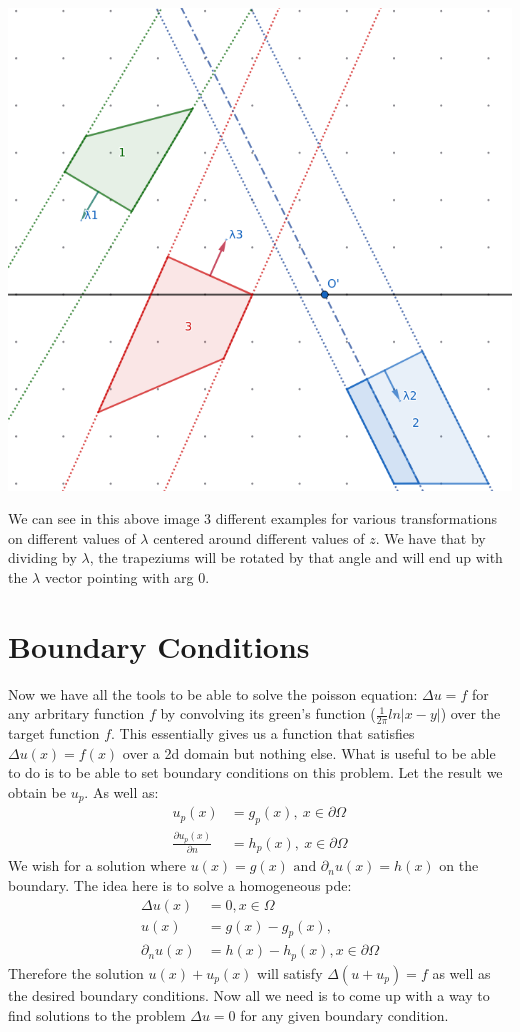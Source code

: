 \documentclass{article}
\begin{document}
\includegraphics[width=\textwidth]{lscale}

We can see in this above image 3 different examples for various transformations on different values of $\lambda$ centered around different values of $z$.
We have that by dividing by $\lambda$, the trapeziums will be rotated by that angle and will end up with the $\lambda$ vector pointing with arg 0.
\section{Boundary Conditions}
Now we have all the tools to be able to solve the poisson equation: $\Delta u=f$ for any arbritary function $f$ by convolving its green's function ($\frac{1}{2\pi}ln|x-y|$) over the target function $f$.
This essentially gives us a function that satisfies $\Delta u(x)=f(x)$ over a 2d domain but nothing else.
What is useful to be able to do is to be able to set boundary conditions on this problem.
Let the result we obtain be $u_p$. As well as:
\begin{align}
    u_p(x)&=g_p(x),\:x\in\partial\Omega\\
    \frac{\partial u_p(x)}{\partial n}&=h_p(x),\:x\in\partial\Omega
\end{align}
We wish for a solution where $u(x)=g(x)\text{ and }\partial_nu(x)=h(x)$ on the boundary.
The idea here is to solve a homogeneous pde:
\begin{align}
    \Delta u(x)&=0, x\in\Omega\\
    u(x)&=g(x)-g_p(x),\\
    \partial_nu(x)&=h(x)-h_p(x),x\in\partial\Omega
\end{align}
Therefore the solution $u(x)+u_p(x)$ will satisfy $\Delta(u+u_p)=f$ as well as the desired boundary conditions.
Now all we need is to come up with a way to find solutions to the problem $\Delta u=0$ for any given boundary condition.
\end{document}

